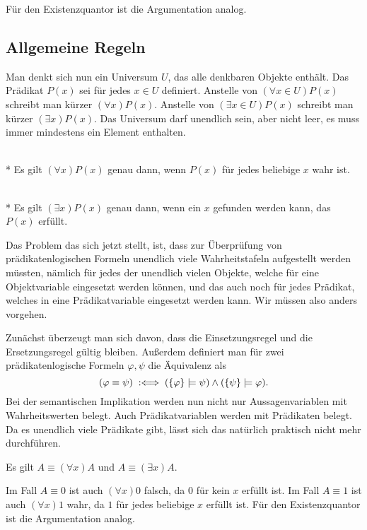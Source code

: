 Für den Existenzquantor ist die Argumentation analog.\;\qedsymbol

\subsection{Allgemeine Regeln}

Man denkt sich nun ein Universum $U$, das alle denkbaren Objekte
enthält. Das Prädikat $P(x)$ sei für jedes $x\in U$ definiert.
Anstelle von $(\forall x\in U)P(x)$ schreibt man kürzer
$(\forall x)P(x)$. Anstelle von $(\exists x\in U)P(x)$ schreibt
man kürzer $(\exists x)P(x)$. Das Universum darf unendlich sein,
aber nicht leer, es muss immer mindestens ein Element enthalten.
\begin{Definition}[Allquantor]\mbox{}\\*
Es gilt $(\forall x)P(x)$ genau dann, wenn $P(x)$ für jedes
beliebige $x$ wahr ist.
\end{Definition}
\begin{Definition}[Existenzquantor]\mbox{}\\*
Es gilt $(\exists x)P(x)$ genau dann, wenn ein $x$ gefunden
werden kann, das $P(x)$ erfüllt.
\end{Definition}
Das Problem das sich jetzt stellt, ist, dass zur Überprüfung
von prädikatenlogischen Formeln unendlich viele Wahrheitstafeln
aufgestellt werden müssten, nämlich für jedes der unendlich vielen
Objekte, welche für eine Objektvariable eingesetzt werden können, und das
auch noch für jedes Prädikat, welches in eine Prädikatvariable
eingesetzt werden kann. Wir müssen also anders vorgehen.

Zunächst überzeugt man sich davon, dass die Einsetzungsregel und die
Ersetzungsregel gültig bleiben. Außerdem definiert man für zwei
prädikatenlogische Formeln $\varphi,\psi$ die Äquivalenz als
\[(\varphi\equiv\psi)\;:\Longleftrightarrow\; (\{\varphi\}\models\psi)\land (\{\psi\}\models\varphi).\]
Bei der semantischen Implikation werden nun nicht nur Aussagenvariablen mit
Wahrheitswerten belegt. Auch Prädikatvariablen werden mit Prädikaten
belegt. Da es unendlich viele Prädikate gibt, lässt sich das natürlich
praktisch nicht mehr durchführen.
\begin{Satz}
Es gilt $A\equiv (\forall x)A$ und $A\equiv(\exists x)A$.
\end{Satz}
 Im Fall $A\equiv 0$ ist auch
$(\forall x)0$ falsch, da $0$ für kein $x$ erfüllt ist.
Im Fall $A\equiv 1$ ist auch $(\forall x)1$ wahr, da $1$ für jedes
beliebige $x$ erfüllt ist. Für den Existenzquantor ist die
Argumentation analog.\;\qedsymbol


